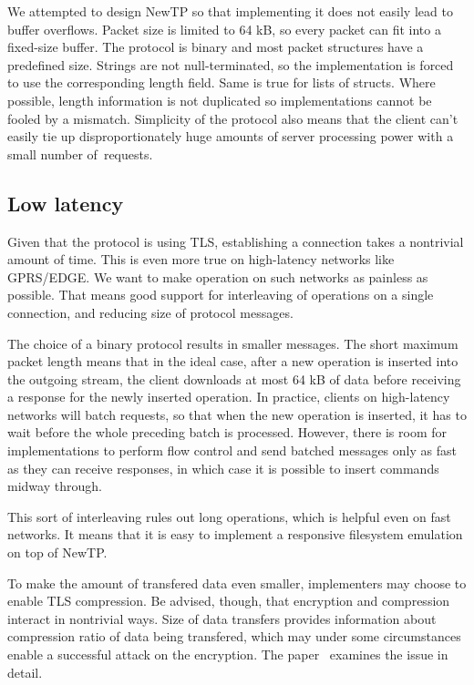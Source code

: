 We attempted to design NewTP so that implementing it does not easily lead to buffer overflows.  Packet size is
limited to 64 kB, so every packet can fit into a fixed-size buffer. The protocol is binary and most packet
structures have a predefined size. Strings are not null-terminated, so the implementation is forced to use the
corresponding length field. Same is true for lists of structs. Where possible, length information is not
duplicated so implementations cannot be fooled by a mismatch. Simplicity of the protocol also means that the
client can't easily tie up disproportionately huge amounts of server processing power with a small number
of~requests.

%

\subsection{Low latency}

Given that the protocol is using TLS, establishing a connection takes a nontrivial amount of time. This is
even more true on high-latency networks like GPRS/EDGE. We want to make operation on such networks as painless
as possible. That means good support for interleaving of operations on a single connection, and reducing size
of protocol messages.

The choice of a binary protocol results in smaller messages. The short maximum packet length means that in the
ideal case, after a new operation is inserted into the outgoing stream, the client downloads at most 64 kB of
data before receiving a response for the newly inserted operation. In practice, clients on high-latency
networks will batch requests, so that when the new operation is inserted, it has to wait before the whole
preceding batch is processed. However, there is room for implementations to perform flow control and send
batched messages only as fast as they can receive responses, in which case it is possible to insert commands
midway through.

This sort of interleaving rules out long operations, which is helpful even on fast networks. It means that it
is easy to implement a responsive filesystem emulation on top of NewTP.

To make the amount of transfered data even smaller, implementers may choose to enable TLS compression. Be
advised, though, that encryption and compression interact in nontrivial ways. Size of data transfers provides
information about compression ratio of data being transfered, which may under some circumstances enable
a successful attack on the encryption. The paper~\cite{kelsey2002} examines the issue in detail.

